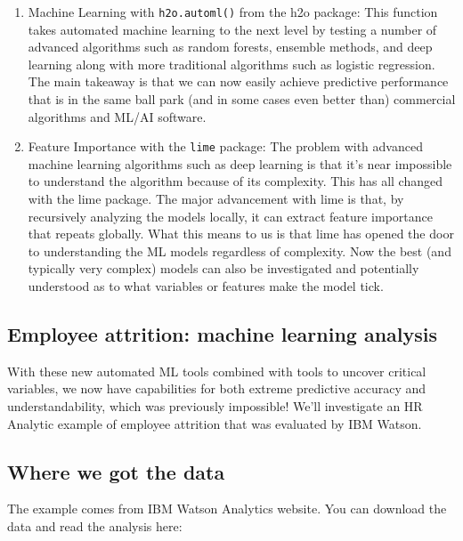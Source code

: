 \documentclass[]{book}
\begin{document}
\begin{enumerate}
\def\labelenumi{\arabic{enumi}.}
\item
  Machine Learning with \texttt{h2o.automl()} from the h2o package: This function takes automated machine learning to the next level by testing a number of advanced algorithms such as random forests, ensemble methods, and deep learning along with more traditional algorithms such as logistic regression. The main takeaway is that we can now easily achieve predictive performance that is in the same ball park (and in some cases even better than) commercial algorithms and ML/AI software.
\item
  Feature Importance with the \texttt{lime} package: The problem with advanced machine learning algorithms such as deep learning is that it's near impossible to understand the algorithm because of its complexity. This has all changed with the lime package. The major advancement with lime is that, by recursively analyzing the models locally, it can extract feature importance that repeats globally. What this means to us is that lime has opened the door to understanding the ML models regardless of complexity. Now the best (and typically very complex) models can also be investigated and potentially understood as to what variables or features make the model tick.
\end{enumerate}

\hypertarget{employee-attrition-machine-learning-analysis}{%
\subsection{Employee attrition: machine learning analysis}\label{employee-attrition-machine-learning-analysis}}

With these new automated ML tools combined with tools to uncover critical variables, we now have capabilities for both extreme predictive accuracy and understandability, which was previously impossible! We'll investigate an HR Analytic example of employee attrition that was evaluated by IBM Watson.

\hypertarget{where-we-got-the-data}{%
\subsection{Where we got the data}\label{where-we-got-the-data}}

The example comes from IBM Watson Analytics website. You can download the data and read the analysis here:
\end{document}
